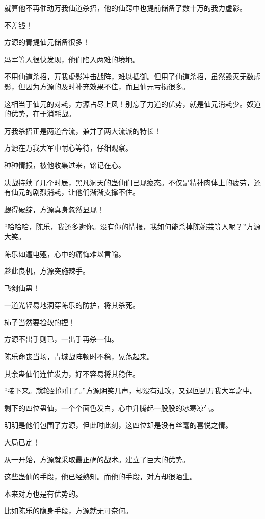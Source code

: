 \begin{this_body}
就算他不再催动万我仙道杀招，他的仙窍中也提前储备了数十万的我力虚影。

不差钱！

方源的青提仙元储备很多！

冯军等人很快发现，他们陷入两难的境地。

不用仙道杀招，万我虚影冲击战阵，难以抵御。但用了仙道杀招，虽然毁灭无数虚影，但因为方源的及时补充效果不佳，而且仙元亏损很多。

这相当于仙元的对耗，方源占尽上风！别忘了力道的优势，就是仙元消耗少。奴道的优势，在于消耗战。

万我杀招正是两道合流，兼并了两大流派的特长！

方源在万我大军中耐心等待，仔细观察。

种种情报，被他收集过来，铭记在心。

决战持续了几个时辰，黑凡洞天的蛊仙们已现疲态。不仅是精神肉体上的疲劳，还有仙元的剧烈消耗，让他们渐渐支撑不住。

觑得破绽，方源真身忽然显现！

“哈哈哈，陈乐，我还多谢你。没有你的情报，我如何能杀掉陈婉芸等人呢？”方源大笑。

陈乐如遭电殛，心中的痛悔难以言喻。

趁此良机，方源突施辣手。

飞剑仙蛊！

一道光轻易地洞穿陈乐的防护，将其杀死。

柿子当然要捡软的捏！

方源不出手则已，一出手再杀一仙。

陈乐命丧当场，青城战阵顿时不稳，晃荡起来。

其余蛊仙们连忙发力，好不容易将其稳住。

“接下来。就轮到你们了。”方源阴笑几声，却没有进攻，又退回到万我大军之中。

剩下的四位蛊仙，一个个面色发白，心中升腾起一股股的冰寒凉气。

明明是他们包围了方源，但此时此刻，这四位却是没有丝毫的喜悦之情。

大局已定！

从一开始，方源就采取最正确的战术。建立了巨大的优势。

这些蛊仙的手段，他已经熟知。而他的手段，对方却很陌生。

本来对方也是有优势的。

比如陈乐的隐身手段，方源就无可奈何。


\end{this_body}
